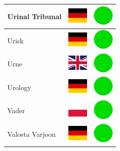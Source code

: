 \documentclass[12pt, a4paper, twoside]{report}
\begin{document}
\begin{center}
\begin{longtable}{|p{5cm}|p{2cm}|p{2cm}|}
 Urinal Tribunal                                            & \includegraphics[width=1cm]{../img/flags/de} &   \includegraphics[width=1cm]{../likes/y} \\ \hline
 Urisk                                                      & \includegraphics[width=1cm]{../img/flags/de} &   \includegraphics[width=1cm]{../likes/y} \\ \hline
 Urne                                                       & \includegraphics[width=1cm]{../img/flags/gb} &   \includegraphics[width=1cm]{../likes/y} \\ \hline
 Urology                                                    & \includegraphics[width=1cm]{../img/flags/de} &   \includegraphics[width=1cm]{../likes/y} \\ \hline
 Vader                                                      & \includegraphics[width=1cm]{../img/flags/pl} &   \includegraphics[width=1cm]{../likes/y} \\ \hline
 Valosta Varjoon                                            & \includegraphics[width=1cm]{../img/flags/de} &   \includegraphics[width=1cm]{../likes/y} \\ \hline

\end{longtable}
\end{center}
\end{document}

